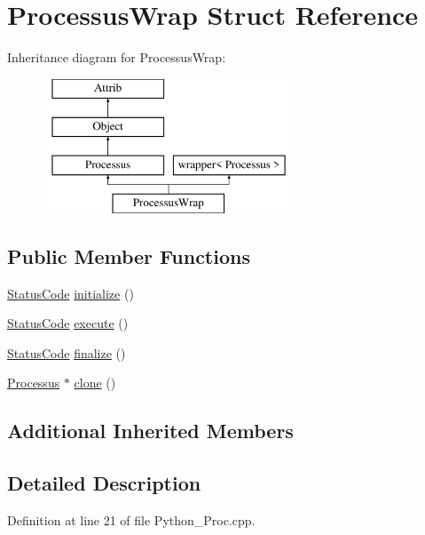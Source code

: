 \hypertarget{structProcessusWrap}{}\section{Processus\+Wrap Struct Reference}
\label{structProcessusWrap}
Inheritance diagram for Processus\+Wrap\+:\begin{figure}[H]
\begin{center}
\leavevmode
\includegraphics[height=4.000000cm]{structProcessusWrap}
\end{center}
\end{figure}
\subsection*{Public Member Functions}
\begin{DoxyCompactItemize}
\item 
\hyperlink{classStatusCode}{Status\+Code} \hyperlink{structProcessusWrap_a7cf48f51e6ac8173255417654cc0b499}{initialize} ()
\item 
\hyperlink{classStatusCode}{Status\+Code} \hyperlink{structProcessusWrap_a099df299b3dadd548c44e7e6d94f027a}{execute} ()
\item 
\hyperlink{classStatusCode}{Status\+Code} \hyperlink{structProcessusWrap_a6be9ef2aaa45c23bc780d264875cc542}{finalize} ()
\item 
\hyperlink{classProcessus}{Processus} $\ast$ \hyperlink{structProcessusWrap_a6582297a477b1cd1594f90a80691fca3}{clone} ()
\end{DoxyCompactItemize}
\subsection*{Additional Inherited Members}


\subsection{Detailed Description}


Definition at line 21 of file Python\+\_\+\+Proc.\+cpp.



